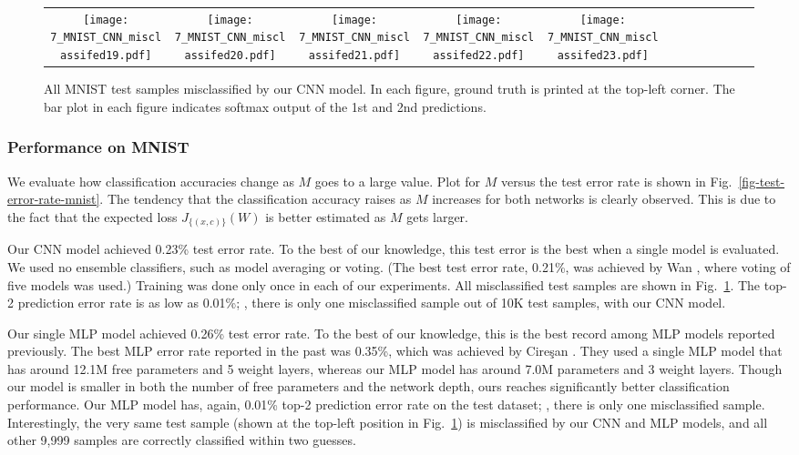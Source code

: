 \documentclass[10pt,twocolumn,letterpaper]{article}
\begin{document}
\begin{figure}[tb]
\begin{center}
\begin{tabular}{cccccccccccc}
\texttt{[image: 7\_MNIST\_CNN\_misclassifed19.pdf]} & \hspace{-0.55cm}
\texttt{[image: 7\_MNIST\_CNN\_misclassifed20.pdf]} & \hspace{-0.55cm}
\texttt{[image: 7\_MNIST\_CNN\_misclassifed21.pdf]} & \hspace{-0.55cm}
\texttt{[image: 7\_MNIST\_CNN\_misclassifed22.pdf]} & \hspace{-0.55cm}
\texttt{[image: 7\_MNIST\_CNN\_misclassifed23.pdf]}
\end{tabular}
\end{center}
\caption{All MNIST test samples misclassified by our CNN model. 
In each figure, ground truth is printed at the top-left corner.
The bar plot in each figure indicates softmax output of the 1st and 2nd predictions.}
\label{fig-MNIST-misclassified}
\end{figure}

\subsubsection{Performance on MNIST}
We evaluate how classification accuracies change as $M$ goes to a large value.
Plot for $M$ versus the test error rate is shown in Fig.~\ref{fig-test-error-rate-mnist}.
The tendency that the classification accuracy raises as $M$ increases for both networks is clearly observed.
This is due to the fact that the expected loss $J_{\{(x,c)\}}(W)$ is better estimated as $M$ gets larger.


Our CNN model achieved 0.23\% test error rate.
To the best of our knowledge, this test error is the best when a single model is evaluated.
We used no ensemble classifiers, such as model averaging or voting.
(The best test error rate, 0.21\%, was achieved by Wan \etal \cite{icml2013_wan13}, 
where voting of five models was used.)
Training was done only once in each of our experiments.
All misclassified test samples are shown in Fig.~\ref{fig-MNIST-misclassified}.
The top-2 prediction error rate is as low as 0.01\%; \ie, there is 
only one misclassified sample out of 10K test samples, 
with our CNN model.

Our single MLP model achieved 0.26\% test error rate.
To the best of our knowledge, this is the best record among MLP models reported previously.
The best MLP error rate reported in the past was 0.35\%, which was achieved by 
Cire{\c s}an \etal \cite{Ciresan:2010}.
They used a single MLP model that has around 12.1M free parameters and 5 weight layers,
whereas our MLP model has around 7.0M parameters and 3 weight layers.
Though our model is smaller in both the number of free parameters and the network depth, 
ours reaches significantly better classification performance.
Our MLP model has, again, 0.01\% top-2 prediction error rate on the test dataset; \ie,
there is only one misclassified sample.
Interestingly, the very same test sample (shown at the top-left position in Fig.~\ref{fig-MNIST-misclassified}) 
is misclassified by our CNN and MLP models, and all other 9,999 samples are correctly classified within two guesses.
\end{document}
